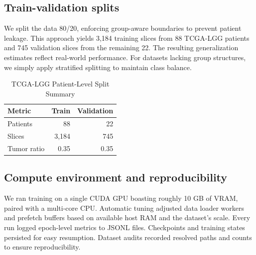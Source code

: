 \documentclass[conference,a4paper]{IEEEtran}
\begin{document}
\subsection{Train-validation splits}
We split the data 80/20, enforcing group-aware boundaries to prevent patient leakage. This approach yields 3,184 training slices from 88 TCGA-LGG patients and 745 validation slices from the remaining 22. The resulting generalization estimates reflect real-world performance. For datasets lacking group structures, we simply apply stratified splitting to maintain class balance.
\begin{table}[t]
\centering
\caption{TCGA-LGG Patient-Level Split Summary}
\label{tab:tcga_split}
\begin{tabular}{l r r}
\toprule
Metric & Train & Validation \\
\midrule
Patients & 88 & 22 \\
Slices & 3,184 & 745 \\
Tumor ratio & 0.35 & 0.35 \\
\bottomrule
\end{tabular}
\end{table}
\subsection{Compute environment and reproducibility}
We ran training on a single CUDA GPU boasting roughly 10 GB of VRAM, paired with a multi-core CPU. Automatic tuning adjusted data loader workers and prefetch buffers based on available host RAM and the dataset's scale. Every run logged epoch-level metrics to JSONL files. Checkpoints and training states persisted for easy resumption. Dataset audits recorded resolved paths and counts to ensure reproducibility.
\end{document}

